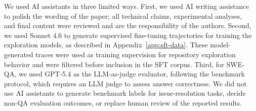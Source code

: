 We used AI assistants in three limited ways. First, we used AI writing assistance to polish the wording of the paper; all technical claims, experimental analyses, and final content were reviewed and are the responsibility of the authors. Second, we used Sonnet 4.6 to generate supervised fine-tuning trajectories for training the exploration models, as described in Appendix~\ref{app:sft-data}. These model-generated traces were used as training supervision for repository exploration behavior and were filtered before inclusion in the SFT corpus. Third, for SWE-QA, we used GPT-5.4 as the LLM-as-judge evaluator, following the benchmark protocol, which requires an LLM judge to assess answer correctness. We did not use AI assistants to generate benchmark labels for issue-resolution tasks, decide non-QA evaluation outcomes, or replace human review of the reported results.



